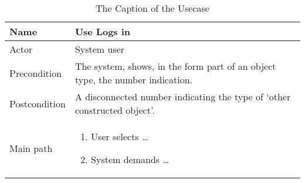 %
%	
%


\newcommand\addrow[2]{#1 &#2\\ }

\newcommand\addheading[2]{#1 &#2\\ \hline}

\newcommand\addmulrow[2]{ \begin{minipage}[t][][t]{3.5cm}#1\end{minipage}%
   & \begin{minipage}[t][][t]{10cm}
    \begin{enumerate}\itemsep-1mm #2   \end{enumerate}
    \end{minipage}\\ }
    
\newcommand*{\UseCaseTableCaption}{} %

\newenvironment{usecase}[1]%
{%
	\renewcommand*{\UseCaseTableCaption}{#1}%
	\begin{table}[htbp]%
		\hspace{5mm}%
		\begin{tabular}{l | p{10cm}}%
		\hline%
}%
{%
		\hline%
		\end{tabular}%
		\caption{\UseCaseTableCaption}%
		\label{tab:\UseCaseTableCaption}%
	\end{table}%
}%


\begin{usecase}{The Caption of the Usecase}
  \addheading{Name}{Use Logs in} 
  \addrow{Actor}{System user}
  \addrow{Precondition}{The system, shows, in the form part of an object type, the number   indication.}
  \addrow{Postcondition}{A disconnected number indicating the type of `other constructed object'.}
  \addmulrow{Main path}{\item User selects \ldots\item System demands \ldots}
\end{usecase}






